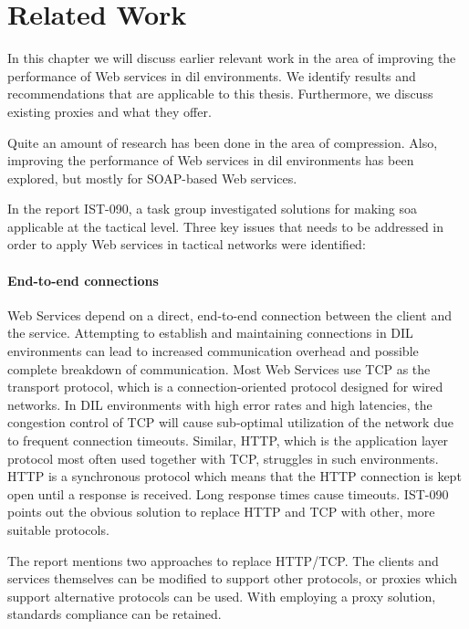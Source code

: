 \chapter{Related Work}

In this chapter we will discuss earlier relevant work in the area of improving
the performance of Web services in \gls{dil} environments. We identify results
and recommendations that are applicable to this thesis. Furthermore, we discuss
existing proxies and what they offer.

Quite an amount of research has been done in the area of compression. Also,
improving the performance of Web services in \gls{dil} environments has been explored,
but mostly for SOAP-based Web services.

In the report IST-090, a task group investigated solutions for making \gls{soa}
applicable at the tactical level. Three key issues that needs to be addressed in
order to apply Web services in tactical networks were
identified\cite{ist-118,ist-090}:

\label{section:DIL-problems}

\subsubsection{End-to-end connections}

Web Services depend on a direct, end-to-end connection between the client and
the service. Attempting to establish and maintaining connections in DIL
environments can lead to increased communication overhead and possible complete
breakdown of communication. Most Web Services use TCP as the transport protocol,
which is a connection-oriented protocol designed for wired networks. In DIL
environments with high error rates and high latencies, the congestion control of
TCP will cause sub-optimal utilization of the network due to frequent connection
timeouts. Similar, HTTP, which is the application layer protocol most often
used together with TCP, struggles in such environments. HTTP is a synchronous
protocol which means that the HTTP connection is kept open until a response is
received. Long response times cause timeouts. IST-090 points out the obvious
solution to replace HTTP and TCP with other, more suitable protocols.

The report\cite{ist-090} mentions two approaches to replace HTTP/TCP. The clients and services
themselves can be modified to support other protocols, or proxies which support
alternative protocols can be used. With employing a proxy solution, standards
compliance can be retained.


